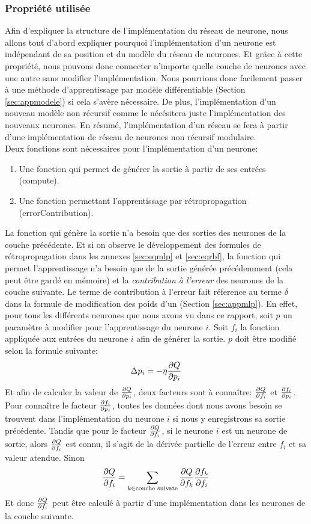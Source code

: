 \documentclass[12pt,a4paper,oneside, titlepage]{article}
\begin{document}
\subsubsection{Propriété utilisée}
Afin d'expliquer la structure de l'implémentation du réseau de neurone, nous allons tout d'abord expliquer pourquoi l'implémentation d'un neurone est indépendant de sa position et du modèle du réseau de neurones.
Et grâce à cette propriété, nous pouvons donc connecter n'importe quelle couche de neurones avec une autre sans modifier l'implémentation.
Nous pourrions donc facilement passer à une méthode d'apprentissage par modèle différentiable (Section \ref{sec:appmodele}) si cela s'avère nécessaire.
De plus, l'implémentation d'un nouveau modèle non récursif comme le \mlp nécésitera juste l'implémentation des nouveaux neurones.
En résumé, l'implémentation d'un réseau \rbf se fera à partir d'une implémentation de réseau de neurones non récursif modulaire.\\

Deux fonctions sont nécessaires pour l'implémentation d'un neurone:
\begin{enumerate}
 \item Une fonction qui permet de générer la sortie à partir de ses entrées (compute).
 \item Une fonction permettant l'apprentissage par rétropropagation (errorContribution).
\end{enumerate}
La fonction qui génère la sortie n'a besoin que des sorties des neurones de la couche précédente.
Et si on observe le développement des formules de rétropropagation dans les annexes \ref{sec:eqmlp} et \ref{sec:eqrbf},
la fonction qui permet l'apprentissage n'a besoin que de la sortie générée précédemment (cela peut être gardé en mémoire) et la \emph{contribution à l'erreur} des neurones de la couche suivante.
Le terme de contribution à l'erreur fait réference au terme $\delta$ dans la formule de modification des poids d'un \mlp (Section \ref{sec:appmlp}).
En effet, pour tous les différents neurones que nous avons vu dans ce rapport, soit $p$ un paramètre à modifier pour l'apprentissage du neurone $i$.
Soit $f_i$ la fonction appliquée aux entrées du neurone $i$ afin de générer la sortie.
$p$ doit être modifié selon la formule suivante:
\[\Delta p_i = -\eta \frac{\partial Q}{\partial p_i}\]
Et afin de calculer la valeur de $\frac{\partial Q}{\partial p_i}$, deux facteurs sont à connaître: $\frac{\partial Q}{\partial f_i}$ et $\frac{\partial f_i}{\partial p_i}$.
Pour connaître le facteur $\frac{\partial f_i}{\partial p_i}$, toutes les données dont nous avons besoin se trouvent dans l'implémentation du neurone $i$ si nous y enregistrons sa sortie précédente.
Tandis que pour le facteur $\frac{\partial Q}{\partial f_i}$,
si le neurone $i$ est un neurone de sortie, alors $\frac{\partial Q}{\partial f_i}$ est connu, il s'agit de la dérivée partielle de l'erreur entre $f_i$ et sa valeur atendue.
Sinon $$\frac{\partial Q}{\partial f_i} = \sum_{k \in \text{couche suivate}}\frac{\partial Q}{\partial f_k}\frac{\partial f_k}{\partial f_i}$$
Et donc $\frac{\partial Q}{\partial f_i}$ peut être calculé à partir d'une implémentation dans les neurones de la couche suivante.
\end{document}
